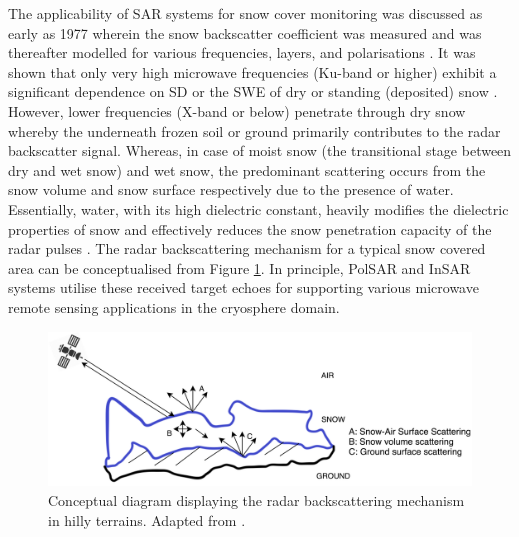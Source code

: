\documentclass[review]{elsarticle}
\numberwithin{equation}{section}
\numberwithin{figure}{section}
\numberwithin{table}{section}
\begin{document}
The applicability of SAR systems for snow cover monitoring was discussed as early as 1977 \citep{Ulaby1977} wherein the snow backscatter coefficient was measured and was thereafter modelled for various frequencies, layers, and polarisations \citep{Zuniga1979}. It was shown that only very high microwave frequencies (Ku-band or higher) exhibit a significant dependence on SD or the SWE of dry or standing (deposited) snow \citep{Yueh2009}. However, lower frequencies (X-band or below) penetrate through dry snow whereby the underneath frozen soil or ground primarily contributes to the radar backscatter signal. Whereas, in case of moist snow (the transitional stage between dry and wet snow) and wet snow, the predominant scattering occurs from the snow volume and snow surface respectively due to the presence of water. Essentially, water, with its high dielectric constant, heavily modifies the dielectric properties of snow and effectively reduces the snow penetration capacity of the radar pulses \citep{Abe1990}. The radar backscattering mechanism for a typical snow covered area can be conceptualised from Figure \ref{fig:concept}. In principle, PolSAR and InSAR systems utilise these received target echoes for supporting various microwave remote sensing applications in the cryosphere domain.

\begin{figure}[htb]
    \centering
    \includegraphics[width=\textwidth]{Figures/Conceptual.png}
    \caption{Conceptual diagram displaying the radar backscattering mechanism in hilly terrains. Adapted from \cite{Thakur2012}.}
    \label{fig:concept}
\end{figure}
\end{document}
